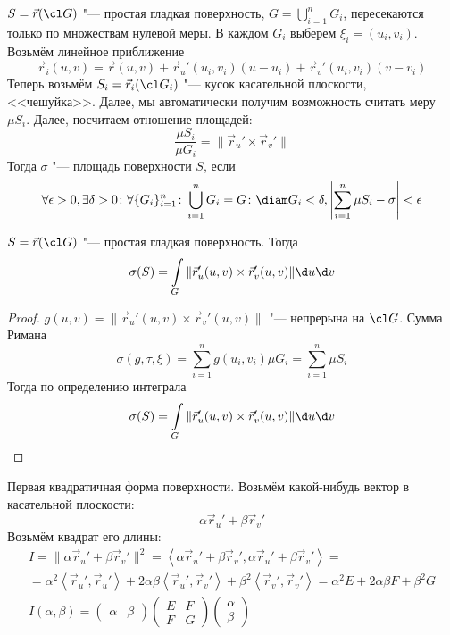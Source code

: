 \begin{Def}
	$S = \vec r(\cl G)$ "--- простая гладкая поверхность, $G = \bigcup_{i=1}^n G_i$, пересекаются только по множествам нулевой меры.
	В каждом $G_i$ выберем $\xi_i = (u_i, v_i)$.
	Возьмём линейное приближение
	\[ \vec r_i(u, v) = \vec r(u, v) + \vec r_u' (u_i, v_i)(u - u_i) + \vec r_v'(u_i, v_i)(v - v_i) \]
	Теперь возьмём $S_i = \vec r_i(\cl G_i)$ "--- кусок касательной плоскости, <<чешуйка>>.
	Далее, мы автоматически получим возможность считать меру $\mu S_i$.
	Далее, посчитаем отношение площадей:
	\[ \frac{\mu S_i}{\mu G_i} = \|\vec r_u' \times \vec r_v' \| \]
	Тогда $\sigma$ "--- площадь поверхности $S$, если
	\[
		\forall \epsilon > 0, \exists \delta > 0\colon \forall \{G_i\}_{i=1}^n\colon \bigcup_{i=1}^n G_i = G\colon
		\diam G_i < \delta, \left| \sum_{i=1}^n \mu S_i - \sigma \right| < \epsilon
	\]
\end{Def}

\begin{theorem}
	$S = \vec r(\cl G)$ "--- простая гладкая поверхность.
	Тогда
	\[ \sigma(S) = \int\limits_{G} \|\vec r_u'(u, v) \times \vec r_v'(u, v)\| \d u \d v \]
\end{theorem}
\begin{proof}
	$g(u, v) = \|\vec r_u'(u, v) \times \vec r_v'(u, v)\|$ "--- непрерына на $\cl G$.
	Сумма Римана
	\[
		\sigma(g, \tau, \xi) = \sum_{i=1}^n g(u_i, v_i) \mu G_i = \sum_{i=1}^n \mu S_i
	\]
	Тогда по определению интеграла
	\[ \sigma(S) = \int\limits_{G} \|\vec r_u'(u, v) \times \vec r_v'(u, v)\| \d u \d v \]
\end{proof}

\begin{Def}
	Первая квадратичная форма поверхности.
	Возьмём какой-нибудь вектор в касательной плоскости:
	\[ \alpha \vec r_u' + \beta \vec r_v' \]
	Возьмём квадрат его длины:
	\begin{gather*}
		I = \|\alpha \vec r_u' + \beta \vec r_v'\|^2
		= \left<\alpha \vec r_u' + \beta \vec r_v',\alpha \vec r_u' + \beta \vec r_v'\right> = \\
		= \alpha^2 \left<\vec r_u', \vec r_u'\right> + 2\alpha\beta \left<\vec r_u', \vec r_v'\right> + \beta^2 \left<\vec r_v', \vec r_v'\right>
		= \alpha^2 E + 2\alpha\beta F + \beta^2 G \\
		I(\alpha, \beta)
		= \begin{pmatrix} \alpha & \beta \end{pmatrix} \begin{pmatrix} E & F \\ F & G \end{pmatrix} \begin{pmatrix} \alpha\\\beta \end{pmatrix}
	\end{gather*}
\end{Def}

